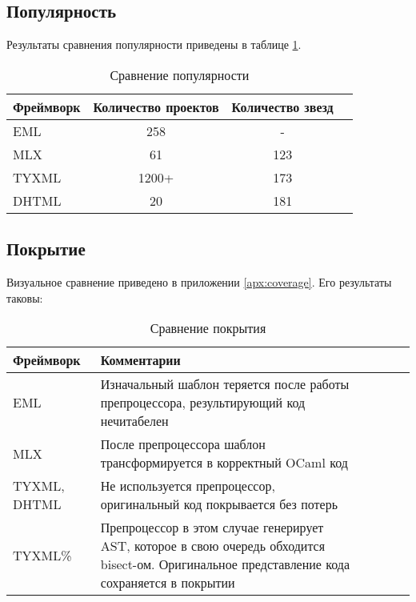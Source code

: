 \subsection{Популярность}

Результаты сравнения популярности приведены в таблице \ref{tab:popularity-comparison}.

\begin{table}[h!]
    \centering
    \begin{tabular}{lccc}
        \toprule
        \textbf{Фреймворк} & \textbf{Количество проектов} & \textbf{Количество звезд} \\
        \midrule
        EML & 258 & - \\
        MLX & 61 & 123 \\
        TYXML & 1200+ & 173 \\
        DHTML & 20 & 181 \\
        \bottomrule
    \end{tabular}
    \caption{Сравнение популярности}
    \label{tab:popularity-comparison}
\end{table}

\subsection{Покрытие}

Визуальное сравнение приведено в приложении \ref{apx:coverage}.
Его результаты таковы:

\begin{table}[h]
    \centering
    \caption{Сравнение покрытия}
    \label{tab:coverage-comparison}
    \begin{tabularx}{\linewidth}{l>{\raggedright\arraybackslash}X>{\raggedright\arraybackslash}XcXX}
        \toprule
        \textbf{Фреймворк} & \textbf{Комментарии} \\
        \midrule
        EML & \cellcolor{yellow!30} Изначальный шаблон теряется после работы препроцессора, результирующий код нечитабелен \\
        MLX & После препроцессора шаблон трансформируется в корректный OCaml код \\
        TYXML, DHTML & Не используется препроцессор, оригинальный код покрывается без потерь \\
        TYXML\% & Препроцессор в этом случае генерирует AST, которое в свою очередь обходится bisect-ом. Оригинальное представление кода сохраняется в покрытии \\
        \bottomrule
    \end{tabularx}
\end{table}

